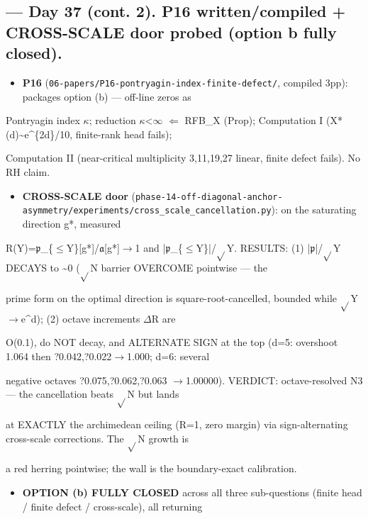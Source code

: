 \documentclass[10pt]{article}
\begin{document}
\subsection*{ --- Day 37 (cont. 2). P16 written/compiled + CROSS-SCALE door probed (option b fully closed).}
\begin{itemize}
\item \textbf{P16} (\texttt{06-papers/P16-pontryagin-index-finite-defect/}, compiled 3pp): packages option (b) --- off-line zeros as
\end{itemize}
  Pontryagin index \ensuremath{\kappa}; reduction \ensuremath{\kappa}<\ensuremath{\infty} \ensuremath{\Leftarrow} RFB\_X (Prop); Computation I (X*(d)\textasciitilde{}e\textasciicircum{}\{2d\}/10, finite-rank head fails);\par
  Computation II (near-critical multiplicity 3,11,19,27 linear, finite defect fails). No RH claim.\par
\begin{itemize}
\item \textbf{CROSS-SCALE door} (\texttt{phase-14-off-diagonal-anchor-asymmetry/experiments/cross\_scale\_cancellation.py}): on the saturating direction g*, measured
\end{itemize}
  R(Y)=\ensuremath{\mathfrak{p}}\_\{\ensuremath{\le}Y\}[g*]/\ensuremath{\mathfrak{a}}[g*]\ensuremath{\to}1 and |\ensuremath{\mathfrak{p}}\_\{\ensuremath{\le}Y\}|/\ensuremath{\sqrt{}}Y. RESULTS: (1) |\ensuremath{\mathfrak{p}}|/\ensuremath{\sqrt{}}Y DECAYS to \textasciitilde{}0 (\ensuremath{\sqrt{}}N barrier OVERCOME pointwise --- the\par
  prime form on the optimal direction is square-root-cancelled, bounded while \ensuremath{\sqrt{}}Y\ensuremath{\to}e\textasciicircum{}d); (2) octave increments \ensuremath{\Delta}R are\par
  O(0.1), do NOT decay, and ALTERNATE SIGN at the top (d=5: overshoot 1.064 then ?0.042,?0.022\ensuremath{\to}1.000; d=6: several\par
  negative octaves ?0.075,?0.062,?0.063 \ensuremath{\to}1.00000). VERDICT: octave-resolved N3 --- the cancellation beats \ensuremath{\sqrt{}}N but lands\par
  at EXACTLY the archimedean ceiling (R=1, zero margin) via sign-alternating cross-scale corrections. The \ensuremath{\sqrt{}}N growth is\par
  a red herring pointwise; the wall is the boundary-exact calibration.\par
\begin{itemize}
\item \textbf{OPTION (b) FULLY CLOSED} across all three sub-questions (finite head / finite defect / cross-scale), all returning
\end{itemize}
\end{document}
